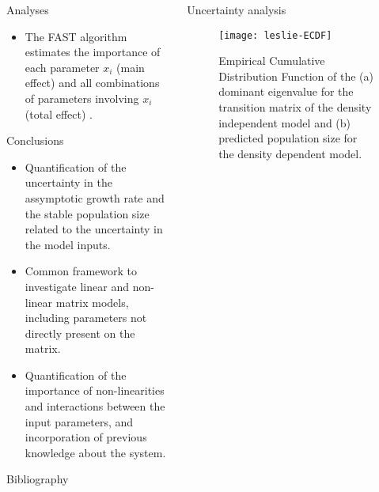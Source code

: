 \documentclass[final]{beamer}
\begin{document}
\begin{frame}{}
\begin{columns}[t]
\begin{column}{.48\linewidth}
\begin{block}{Analyses}
\begin{itemize}
		\item The FAST algorithm estimates the importance of each parameter $x_i$ (main effect) and all 
		combinations of	parameters involving $x_i$ (total effect) \cite{Marino08}.
		\end{itemize}
		\end{block}
		\begin{block}{Conclusions}
		\begin{itemize}
		\item Quantification of the uncertainty in the assymptotic growth rate and the stable 
		population size related to the uncertainty in the model inputs.
		\item Common framework to investigate linear and non-linear matrix models,
		including parameters not directly present on the matrix.
		\item Quantification of the importance of non-linearities and interactions between
		the input parameters, and incorporation of previous knowledge about the system.
		\end{itemize}
		\end{block}
		\vfill
        \begin{block}{Bibliography}
		
		\scriptsize{}
        \end{block}
      \end{column}
      \begin{column}{.48\linewidth}
        \begin{block}{Uncertainty analysis}
		\begin{figure}
		\begin{center}
		\texttt{[image: leslie-ECDF]}
		\end{center}
		\caption{Empirical Cumulative Distribution Function of the (a) dominant eigenvalue for the transition matrix of the density independent model and (b) predicted population size for the density dependent model.
}
\end{figure}
\end{block}
\end{column}
\end{columns}
\end{frame}
\end{document}
